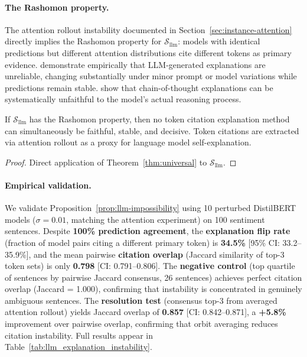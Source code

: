 \paragraph{The Rashomon property.}
The attention rollout instability documented in
Section~\ref{sec:instance-attention} directly implies the Rashomon property
for $\mathcal{S}_{\mathrm{llm}}$: models with identical predictions but
different attention distributions cite different tokens as primary evidence.
\citet{ye2022unreliability} demonstrate empirically that LLM-generated
explanations are unreliable, changing substantially under minor prompt or
model variations while predictions remain stable.  \citet{turpin2024language}
show that chain-of-thought explanations can be systematically unfaithful
to the model's actual reasoning process.

\begin{proposition}
\label{prop:llm-impossibility}
If $\mathcal{S}_{\mathrm{llm}}$ has the Rashomon property, then no
token citation explanation method can simultaneously be faithful, stable,
and decisive. Token citations are extracted via attention rollout as a proxy
for language model self-explanation.
\end{proposition}

\begin{proof}
Direct application of Theorem~\ref{thm:universal} to
$\mathcal{S}_{\mathrm{llm}}$.
\end{proof}

\paragraph{Empirical validation.}
We validate Proposition~\ref{prop:llm-impossibility} using 10 perturbed
DistilBERT models ($\sigma = 0.01$, matching the attention experiment)
on 100 sentiment sentences.  Despite \textbf{100\% prediction agreement},
the \textbf{explanation flip rate} (fraction of model pairs citing a
different primary token) is \textbf{34.5\%} [95\% CI: 33.2--35.9\%],
and the mean pairwise \textbf{citation overlap} (Jaccard similarity of
top-3 token sets) is only \textbf{0.798} [CI: 0.791--0.806].
The \textbf{negative control} (top quartile of sentences by pairwise
Jaccard consensus, 26 sentences) achieves perfect citation overlap
(Jaccard = 1.000), confirming that instability is concentrated in
genuinely ambiguous sentences.
The \textbf{resolution test} (consensus top-3 from averaged attention
rollout) yields Jaccard overlap of \textbf{0.857} [CI: 0.842--0.871],
a \textbf{+5.8\%} improvement over pairwise overlap, confirming that
orbit averaging reduces citation instability.
Full results appear in Table~\ref{tab:llm_explanation_instability}.

